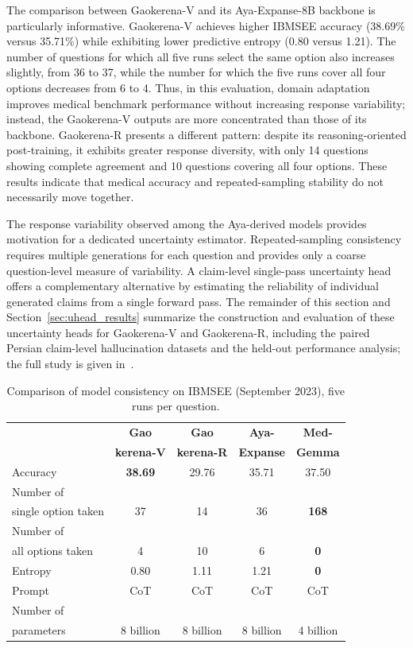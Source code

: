 \documentclass[review]{elsarticle}
\begin{document}
The comparison between Gaokerena-V and its Aya-Expanse-8B backbone is particularly informative. Gaokerena-V achieves higher IBMSEE accuracy (38.69\% versus 35.71\%) while exhibiting lower predictive entropy (0.80 versus 1.21). The number of questions for which all five runs select the same option also increases slightly, from 36 to 37, while the number for which the five runs cover all four options decreases from 6 to 4. Thus, in this evaluation, domain adaptation improves medical benchmark performance without increasing response variability; instead, the Gaokerena-V outputs are more concentrated than those of its backbone. Gaokerena-R presents a different pattern: despite its reasoning-oriented post-training, it exhibits greater response diversity, with only 14 questions showing complete agreement and 10 questions covering all four options. These results indicate that medical accuracy and repeated-sampling stability do not necessarily move together.

The response variability observed among the Aya-derived models provides motivation for a dedicated uncertainty estimator. Repeated-sampling consistency requires multiple generations for each question and provides only a coarse question-level measure of variability. A claim-level single-pass uncertainty head offers a complementary alternative by estimating the reliability of individual generated claims from a single forward pass. The remainder of this section and Section~\ref{sec:uhead_results} summarize the construction and evaluation of these uncertainty heads for Gaokerena-V and Gaokerena-R, including the paired Persian claim-level hallucination datasets and the held-out performance analysis; the full study is given in~\cite{b40}.

\begin{table}[ht]
\centering
\begin{tabular}{|l|c|c|c|c|}
\hline
\textbf{} & \textbf{Gao} & \textbf{Gao} & \textbf{Aya-} & \textbf{Med-} \\
\textbf{} & \textbf{kerena-V} & \textbf{kerena-R} & \textbf{Expanse} & \textbf{Gemma} \\ \hline
Accuracy & \textbf{38.69} & 29.76 & 35.71 & 37.50 \\ \hline
Number of & & & &\\
single option taken & 37 & 14 & 36 & \textbf{168} \\ \hline
Number of & & & & \\
all options taken & 4 & 10 & 6 & \textbf{0} \\ \hline
Entropy & 0.80 & 1.11 & 1.21 & \textbf{0} \\ \hline
Prompt & CoT & CoT & CoT & CoT \\ \hline
Number of & & & & \\
parameters & 8 billion & 8 billion & 8 billion & 4 billion \\ \hline
\end{tabular}
\caption{Comparison of model consistency on IBMSEE (September 2023), five runs per question.}
\label{tab:uhead_consistency}
\end{table}
\end{document}
